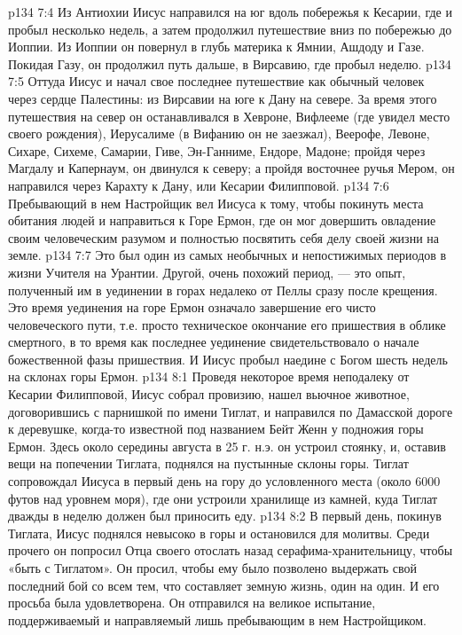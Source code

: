 \vs p134 7:4 Из Антиохии Иисус направился на юг вдоль побережья к Кесарии, где и пробыл несколько недель, а затем продолжил путешествие вниз по побережью до Иоппии. Из Иоппии он повернул в глубь материка к Ямнии, Ашдоду и Газе. Покидая Газу, он продолжил путь дальше, в Вирсавию, где пробыл неделю.
\vs p134 7:5 Оттуда Иисус и начал свое последнее путешествие как обычный человек через сердце Палестины: из Вирсавии на юге к Дану на севере. За время этого путешествия на север он останавливался в Хевроне, Вифлееме (где увидел место своего рождения), Иерусалиме (в Вифанию он не заезжал), Веерофе, Левоне, Сихаре, Сихеме, Самарии, Гиве, Эн\hyp{}Ганниме, Ендоре, Мадоне; пройдя через Магдалу и Капернаум, он двинулся к северу; а пройдя восточнее ручья Мером, он направился через Карахту к Дану, или Кесарии Филипповой.
\vs p134 7:6 Пребывающий в нем Настройщик вел Иисуса к тому, чтобы покинуть места обитания людей и направиться к Горе Ермон, где он мог довершить овладение своим человеческим разумом и полностью посвятить себя делу своей жизни на земле.
\vs p134 7:7 Это был один из самых необычных и непостижимых периодов в жизни Учителя на Урантии. Другой, очень похожий период, --- это опыт, полученный им в уединении в горах недалеко от Пеллы сразу после крещения. Это время уединения на горе Ермон означало завершение его чисто человеческого пути, т.е. просто техническое окончание его пришествия в облике смертного, в то время как последнее уединение свидетельствовало о начале божественной фазы пришествия. И Иисус пробыл наедине с Богом шесть недель на склонах горы Ермон.
\vs p134 8:1 Проведя некоторое время неподалеку от Кесарии Филипповой, Иисус собрал провизию, нашел вьючное животное, договорившись с парнишкой по имени Тиглат, и направился по Дамасской дороге к деревушке, когда\hyp{}то известной под названием Бейт Женн у подножия горы Ермон. Здесь около середины августа в 25 г. н.э. он устроил стоянку, и, оставив вещи на попечении Тиглата, поднялся на пустынные склоны горы. Тиглат сопровождал Иисуса в первый день на гору до условленного места (около 6000 футов над уровнем моря), где они устроили хранилище из камней, куда Тиглат дважды в неделю должен был приносить еду.
\vs p134 8:2 В первый день, покинув Тиглата, Иисус поднялся невысоко в горы и остановился для молитвы. Среди прочего он попросил Отца своего отослать назад серафима\hyp{}хранительницу, чтобы «быть с Тиглатом». Он просил, чтобы ему было позволено выдержать свой последний бой со всем тем, что составляет земную жизнь, один на один. И его просьба была удовлетворена. Он отправился на великое испытание, поддерживаемый и направляемый лишь пребывающим в нем Настройщиком.
